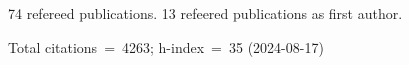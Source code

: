 74 refereed publications. 13 refeered publications as first author.

Total citations~=~4263; h-index~=~35 (2024-08-17)